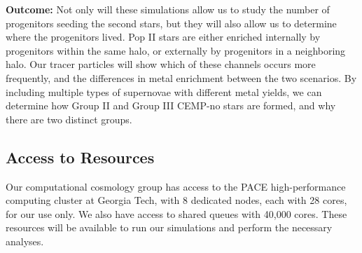 \documentclass[letterpaper, 12pt]{article}
\begin{document}
\textbf{Outcome:} Not only will these simulations allow us to study the number of progenitors seeding the second stars, but they will also allow us to determine where the progenitors lived. Pop II stars are either enriched internally by progenitors within the same halo, or externally by progenitors in a neighboring halo. Our tracer particles will show which of these channels occurs more frequently, and the differences in metal enrichment between the two scenarios. By including multiple types of supernovae with different metal yields, we can determine how Group II and Group III CEMP-no stars are formed, and why there are two distinct groups.



\subsection*{Access to Resources}

Our computational cosmology group has access to the PACE high-performance computing cluster at Georgia Tech, with 8 dedicated nodes, each with 28 cores, for our use only. We also have access to shared queues with 40,000 cores. These resources will be available to run our simulations and perform the necessary analyses. 
\end{document}
